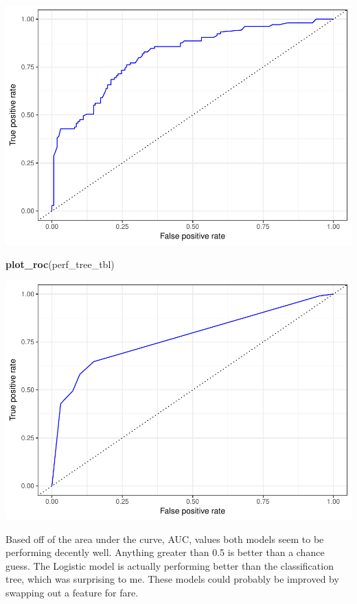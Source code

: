 \documentclass[]{article}
\newenvironment{Shaded}{\begin{snugshade}}{\end{snugshade}}
\newcommand{\KeywordTok}[1]{\textcolor[rgb]{0.13,0.29,0.53}{\textbf{#1}}}
\newcommand{\NormalTok}[1]{#1}
\begin{document}
\includegraphics{./tex2pdf.13052/c121bc234d5332f335887d3567b0fa306b099364.pdf}

\begin{Shaded}
\begin{Highlighting}[]
\KeywordTok{plot_roc}\NormalTok{(perf_tree_tbl)}
\end{Highlighting}
\end{Shaded}

\includegraphics{./tex2pdf.13052/5d97af7ca217d219a91bd628217bc3c75190493c.pdf}

Based off of the area under the curve, AUC, values both models seem to
be performing decently well. Anything greater than 0.5 is better than a
chance guess. The Logistic model is actually performing better than the
classification tree, which was surprising to me. These models could
probably be improved by swapping out a feature for fare.
\end{document}
